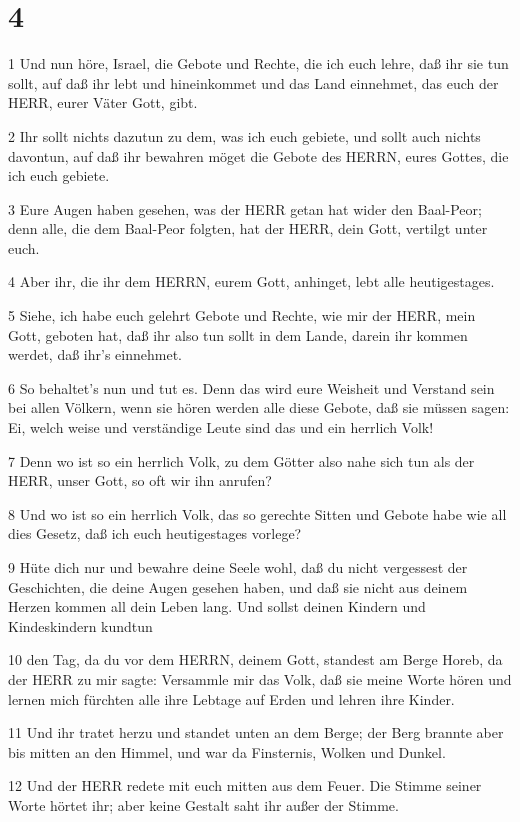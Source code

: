 \chapter{4}

\par 1 Und nun höre, Israel, die Gebote und Rechte, die ich euch lehre, daß ihr sie tun sollt, auf daß ihr lebt und hineinkommet und das Land einnehmet, das euch der HERR, eurer Väter Gott, gibt.
\par 2 Ihr sollt nichts dazutun zu dem, was ich euch gebiete, und sollt auch nichts davontun, auf daß ihr bewahren möget die Gebote des HERRN, eures Gottes, die ich euch gebiete.
\par 3 Eure Augen haben gesehen, was der HERR getan hat wider den Baal-Peor; denn alle, die dem Baal-Peor folgten, hat der HERR, dein Gott, vertilgt unter euch.
\par 4 Aber ihr, die ihr dem HERRN, eurem Gott, anhinget, lebt alle heutigestages.
\par 5 Siehe, ich habe euch gelehrt Gebote und Rechte, wie mir der HERR, mein Gott, geboten hat, daß ihr also tun sollt in dem Lande, darein ihr kommen werdet, daß ihr's einnehmet.
\par 6 So behaltet's nun und tut es. Denn das wird eure Weisheit und Verstand sein bei allen Völkern, wenn sie hören werden alle diese Gebote, daß sie müssen sagen: Ei, welch weise und verständige Leute sind das und ein herrlich Volk!
\par 7 Denn wo ist so ein herrlich Volk, zu dem Götter also nahe sich tun als der HERR, unser Gott, so oft wir ihn anrufen?
\par 8 Und wo ist so ein herrlich Volk, das so gerechte Sitten und Gebote habe wie all dies Gesetz, daß ich euch heutigestages vorlege?
\par 9 Hüte dich nur und bewahre deine Seele wohl, daß du nicht vergessest der Geschichten, die deine Augen gesehen haben, und daß sie nicht aus deinem Herzen kommen all dein Leben lang. Und sollst deinen Kindern und Kindeskindern kundtun
\par 10 den Tag, da du vor dem HERRN, deinem Gott, standest am Berge Horeb, da der HERR zu mir sagte: Versammle mir das Volk, daß sie meine Worte hören und lernen mich fürchten alle ihre Lebtage auf Erden und lehren ihre Kinder.
\par 11 Und ihr tratet herzu und standet unten an dem Berge; der Berg brannte aber bis mitten an den Himmel, und war da Finsternis, Wolken und Dunkel.
\par 12 Und der HERR redete mit euch mitten aus dem Feuer. Die Stimme seiner Worte hörtet ihr; aber keine Gestalt saht ihr außer der Stimme.
